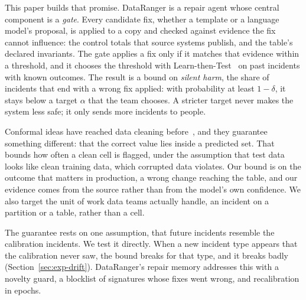 This paper builds that promise. DataRanger is a repair agent whose central component is a \emph{gate}. Every candidate fix, whether a template or a language model's proposal, is applied to a copy and checked against evidence the fix cannot influence: the control totals that source systems publish, and the table's declared invariants. The gate applies a fix only if it matches that evidence within a threshold, and it chooses the threshold with Learn-then-Test~\cite{angelopoulos2021ltt} on past incidents with known outcomes. The result is a bound on \emph{silent harm}, the share of incidents that end with a wrong fix applied: with probability at least $1-\delta$, it stays below a target $\alpha$ that the team chooses. A stricter target never makes the system less safe; it only sends more incidents to people.

Conformal ideas have reached data cleaning before~\cite{jaeger2024cdc,biessmann2026cured,liu2026progressive}, and they guarantee something different: that the correct value lies inside a predicted set. That bounds how often a clean cell is flagged, under the assumption that test data looks like clean training data, which corrupted data violates. Our bound is on the outcome that matters in production, a wrong change reaching the table, and our evidence comes from the source rather than from the model's own confidence. We also target the unit of work data teams actually handle, an incident on a partition or a table, rather than a cell.

The guarantee rests on one assumption, that future incidents resemble the calibration incidents. We test it directly. When a new incident type appears that the calibration never saw, the bound breaks for that type, and it breaks badly (Section~\ref{sec:exp-drift}). DataRanger's repair memory addresses this with a novelty guard, a blocklist of signatures whose fixes went wrong, and recalibration in epochs.

